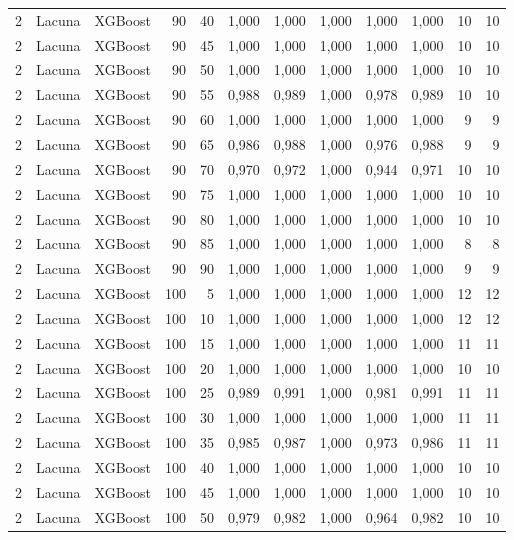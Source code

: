 \begin{longtable}{@{}rllrrrrrrrrr@{}}
2 & Lacuna & XGBoost & 90 & 40 & 1,000 & 1,000 & 1,000 & 1,000 & 1,000 & 10 & 10 \\
2 & Lacuna & XGBoost & 90 & 45 & 1,000 & 1,000 & 1,000 & 1,000 & 1,000 & 10 & 10 \\
2 & Lacuna & XGBoost & 90 & 50 & 1,000 & 1,000 & 1,000 & 1,000 & 1,000 & 10 & 10 \\
2 & Lacuna & XGBoost & 90 & 55 & 0,988 & 0,989 & 1,000 & 0,978 & 0,989 & 10 & 10 \\
2 & Lacuna & XGBoost & 90 & 60 & 1,000 & 1,000 & 1,000 & 1,000 & 1,000 & 9 & 9 \\
2 & Lacuna & XGBoost & 90 & 65 & 0,986 & 0,988 & 1,000 & 0,976 & 0,988 & 9 & 9 \\
2 & Lacuna & XGBoost & 90 & 70 & 0,970 & 0,972 & 1,000 & 0,944 & 0,971 & 10 & 10 \\
2 & Lacuna & XGBoost & 90 & 75 & 1,000 & 1,000 & 1,000 & 1,000 & 1,000 & 10 & 10 \\
2 & Lacuna & XGBoost & 90 & 80 & 1,000 & 1,000 & 1,000 & 1,000 & 1,000 & 10 & 10 \\
2 & Lacuna & XGBoost & 90 & 85 & 1,000 & 1,000 & 1,000 & 1,000 & 1,000 & 8 & 8 \\
2 & Lacuna & XGBoost & 90 & 90 & 1,000 & 1,000 & 1,000 & 1,000 & 1,000 & 9 & 9 \\
2 & Lacuna & XGBoost & 100 & 5 & 1,000 & 1,000 & 1,000 & 1,000 & 1,000 & 12 & 12 \\
2 & Lacuna & XGBoost & 100 & 10 & 1,000 & 1,000 & 1,000 & 1,000 & 1,000 & 12 & 12 \\
2 & Lacuna & XGBoost & 100 & 15 & 1,000 & 1,000 & 1,000 & 1,000 & 1,000 & 11 & 11 \\
2 & Lacuna & XGBoost & 100 & 20 & 1,000 & 1,000 & 1,000 & 1,000 & 1,000 & 10 & 10 \\
2 & Lacuna & XGBoost & 100 & 25 & 0,989 & 0,991 & 1,000 & 0,981 & 0,991 & 11 & 11 \\
2 & Lacuna & XGBoost & 100 & 30 & 1,000 & 1,000 & 1,000 & 1,000 & 1,000 & 11 & 11 \\
2 & Lacuna & XGBoost & 100 & 35 & 0,985 & 0,987 & 1,000 & 0,973 & 0,986 & 11 & 11 \\
2 & Lacuna & XGBoost & 100 & 40 & 1,000 & 1,000 & 1,000 & 1,000 & 1,000 & 10 & 10 \\
2 & Lacuna & XGBoost & 100 & 45 & 1,000 & 1,000 & 1,000 & 1,000 & 1,000 & 10 & 10 \\
2 & Lacuna & XGBoost & 100 & 50 & 0,979 & 0,982 & 1,000 & 0,964 & 0,982 & 10 & 10 \\

\end{longtable}
